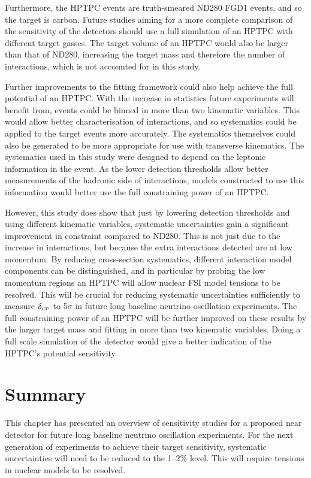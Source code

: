 Furthermore, the HPTPC events are truth-smeared ND280 FGD1 events, and so the target is carbon. Future studies aiming for a more complete comparison of the sensitivity of the detectors should use a full simulation of an HPTPC with different target gasses. The target volume of an HPTPC would also be larger than that of ND280, increasing the target mass and therefore the number of interactions, which is not accounted for in this study. 

Further improvements to the fitting framework could also help achieve the full potential of an HPTPC. With the increase in statistics future experiments will benefit from, events could be binned in more than two kinematic variables. This would allow better characterisation of interactions, and so systematics could be applied to the target events more accurately. The systematics themselves could also be generated to be more appropriate for use with transverse kinematics. The systematics used in this study were designed to depend on the leptonic information in the event. As the lower detection thresholds allow better measurements of the hadronic side of interactions, models constructed to use this information would better use the full constraining power of an HPTPC.

However, this study does show that just by lowering detection thresholds and using different kinematic variables, systematic uncertainties gain a significant improvement in constraint compared to ND280. This is not just due to the increase in interactions, but because the extra interactions detected are at low momentum. By reducing cross-section systematics, different interaction model components can be distinguished, and in particular by probing the low momentum regions an HPTPC will allow nuclear FSI model tensions to be resolved. This will be crucial for reducing systematic uncertainties sufficiently to measure $\delta_{\scriptscriptstyle\mathrm{CP}}$ to 5$\sigma$ in future long baseline neutrino oscillation experiments. The full constraining power of an HPTPC will be further improved on these results by the larger target mass and fitting in more than two kinematic variables. Doing a full scale simulation of the detector would give a better indication of the HPTPC's potential sensitivity.

\section{Summary}

This chapter has presented an overview of sensitivity studies for a proposed near detector for future long baseline neutrino oscillation experiments. For the next generation of experiments to achieve their target sensitivity, systematic uncertainties will need to be reduced to the 1--2$\%$ level. This will require tensions in nuclear models to be resolved.

